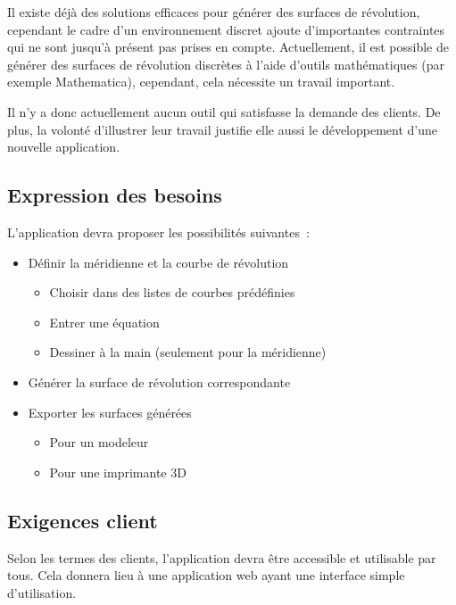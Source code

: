 \documentclass{scrartcl}
\begin{document}
Il existe déjà des solutions efficaces pour générer des surfaces de révolution, cependant le cadre d'un environnement discret ajoute d'importantes contraintes qui ne sont jusqu'à présent pas prises en compte. Actuellement, il est possible de générer des surfaces de révolution discrètes à l'aide d'outils mathématiques (par exemple Mathematica), cependant, cela nécessite un travail important. 

Il n'y a donc actuellement aucun outil qui satisfasse la demande des clients. De plus, la volonté d'illustrer leur travail justifie elle aussi le développement d'une nouvelle application.


	\subsection{Expression des besoins}
		L'application devra proposer les possibilités suivantes~:
		\begin{itemize}[label={*}]
			\item Définir la méridienne et la courbe de révolution
			\begin{itemize}[label={-}]
				\item Choisir dans des listes de courbes prédéfinies
				\item Entrer une équation
				\item Dessiner à la main (seulement pour la méridienne)
			\end{itemize}
			\item Générer la surface de révolution correspondante
			\item Exporter les surfaces générées
			\begin{itemize}[label={-}]
				\item Pour un modeleur
				\item Pour une imprimante 3D
			\end{itemize}
		\end{itemize}

	\subsection{Exigences client}
		Selon les termes des clients, l'application devra être accessible et utilisable par tous. Cela donnera lieu à une application web ayant une interface simple d'utilisation.

\end{document}
